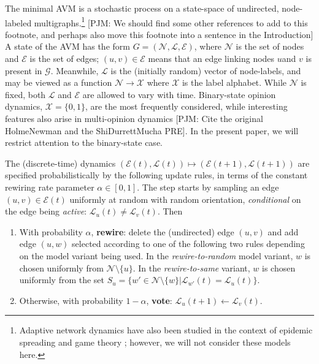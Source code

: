 \documentclass[review, onefignum, onetabnum]{siamart171218}
\newcommand{\pjm}[1]{{\color{blue}[PJM: #1]}}
\begin{document}
	The minimal AVM is a stochastic process on a state-space of undirected, node-labeled multigraphs.\footnote{Adaptive network dynamics have also been studied in the context of epidemic spreading \cite{Marceau2010,Lee2017} and game theory \cite{Malik2016}; however, we will not consider these models here.} \pjm{We should find some other references to add to this footnote, and perhaps also move this footnote into a sentence in the Introduction} 
	A state of the AVM has the form $G = (\mathcal{N}, \mathcal{L}, \mathcal{E})$, where $\mathcal{N}$ is the set of nodes and $\mathcal{E}$ is the set of edges; $(u,v) \in \mathcal{E}$ means that an edge linking nodes $u$and $v$ is present in $\mathcal{G}$.
    Meanwhile, $\mathcal{L}$ is the (initially random) vector of node-labels, and may be viewed as a function $\mathcal{N} \rightarrow \mathcal{X}$ where $\mathcal{X}$ is the label alphabet.  
	While $\mathcal{N}$ is fixed, both $\mathcal{L}$ and $\mathcal{E}$ are allowed to vary with time. 
	Binary-state opinion dynamics, $\mathcal{X} = \{0,1\}$, are the most frequently considered, while interesting features also arise in multi-opinion dynamics \pjm{Cite the original HolmeNewman and the ShiDurrettMucha PRE}. In the present paper, we will restrict attention to the binary-state case.
	
	The (discrete-time) dynamics $(\mathcal{E}(t), \mathcal{L}(t)) \mapsto (\mathcal{E}(t+1), \mathcal{L}(t+1))$ are specified probabilistically by the following update rules, in terms of the constant rewiring rate parameter $\alpha\in [0,1]$. The step starts by sampling an edge $(u,v) \in \mathcal{E}(t)$ uniformly at random with random orientation, \emph{conditional} on the edge being \emph{active}: $\mathcal{L}_u(t) \neq \mathcal{L}_v(t)$. Then
		\begin{enumerate}
			\item With probability $\alpha$, \textbf{rewire}: delete the (undirected) edge $(u,v)$ and add edge $(u,w)$ selected according to one of the following two rules depending on the model variant being used. 
			In the \emph{rewire-to-random} model variant, $w$ is chosen uniformly from $\mathcal{N}\setminus \{u\}$. 
			In the \emph{rewire-to-same} variant, $w$ is chosen uniformly from the set $S_u = \{w' \in \mathcal{N}\setminus \{w\} | \mathcal{L}_{w'}(t) = \mathcal{L}_u(t)\}$. 
			\item Otherwise, with probability $1-\alpha$, \textbf{vote}:  $\mathcal{L}_u(t+1) \gets \mathcal{L}_v(t)$. 
		\end{enumerate}
    
\end{document}
